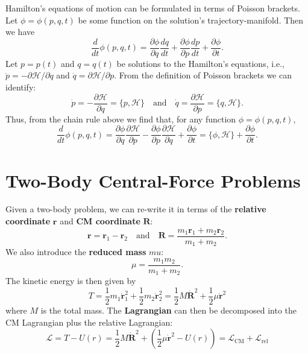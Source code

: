 \documentclass{book}
\theoremstyle{definition}
\newcommand{\p}{\partial}
\newcommand{\lag}{\mathcal{L}}
\newcommand{\ham}{\mathcal{H}}
\newcommand{\f}[2]{\frac{#1}{#2}}
\newcommand{\lp}{\left(}
\newcommand{\rp}{\right)}
\begin{document}
Hamilton's equations of motion can be formulated in terms of Poisson brackets. Let $\phi = \phi(p,q,t)$ be some function on the solution's trajectory-manifold. Then we have
\begin{equation*}
\f{d}{dt}\phi(p,q,t) = \f{\p \phi}{\p q} \f{d q}{dt} + \f{\p \phi }{\p p} \f{d p}{dt} + \f{\p \phi}{\p t}.
\end{equation*}
Let $p = p(t)$ and $q = q(t)$ be solutions to the Hamilton's equations, i.e., $\dot{p} = -\p \ham / \p q$ and $\dot{q} = \p \ham  / \p p$. From the definition of Poisson brackets we can identify:
\begin{equation*}
\dot{p} = -\f{\p \ham}{\p q} = \{ p,\ham \} \quad \text{and} \quad \dot{q} = \f{\p \ham}{\p p} = \{ q,\ham \}.
\end{equation*}
Thus, from the chain rule above we find that, for any function $\phi = \phi(p,q,t)$,
\begin{equation*}
\f{d}{dt}\phi(p,q,t) = \f{\p \phi}{\p q} \f{\p \ham}{\p p} - \f{\p \phi}{\p p}\f{\p \ham}{\p q} + \f{\p \phi}{\p t} = \{ \phi,\ham \} + \f{\p \phi}{\p t}.
\end{equation*}


\section{Two-Body Central-Force Problems}

Given a two-body problem, we can re-write it in terms of the \textbf{relative coordinate} $\textbf{r}$ and \textbf{CM coordinate} $\textbf{R}$:
\begin{equation*}
\textbf{r} = \textbf{r}_1 - \textbf{r}_2 \quad \text{and} \quad \textbf{R}  = \f{m_1 \textbf{r}_1 + m_2 \textbf{r}_2}{m_1+m_2}.
\end{equation*}
We also introduce the \textbf{reduced mass} $mu$:
\begin{equation*}
\mu = \f{m_1 m_2}{m_1 + m_2}.
\end{equation*}
The {kinetic energy} is then given by 
\begin{equation*}
T = \f{1}{2}m_1 \dot{\textbf{r}}_1^2 + \f{1}{2}m_2 \dot{\textbf{r}}_2^2 = \f{1}{2}M\dot{\textbf{R}}^2 + \f{1}{2}\mu \dot{\textbf{r}}^2
\end{equation*}
where $M$ is the total mass. The \textbf{Lagrangian} can then be decomposed into the CM Lagrangian plus the relative Lagrangian:
\begin{equation*}
\lag = T - U(r) = \f{1}{2}M\dot{\textbf{R}}^2 + \lp \f{1}{2}\mu \dot{\textbf{r}}^2 - U(r) \rp =  \lag_\text{CM} + \lag_{\text{rel}}
\end{equation*}
\end{document}
